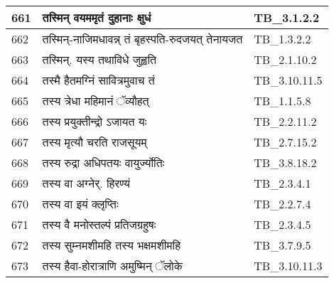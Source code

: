 \documentclass[17pt]{extarticle}
\begin{document}
\begin{longtable}{||p{0.4in}||p{4.9in}||p{0.9in}||}
    \hline
        
    661 & तस्मिन् वयममृतं दुहानाः क्षुधं & TB\_3.1.2.2       \\
    
    \hline
        
    662 & तस्मिन्{-}नाजिमधावन्न् तं बृहस्पति{-}रुदजयत् तेनायजत & TB\_1.3.2.2       \\
    
    \hline
        
    663 & तस्मिन्. यस्य तथाविधे जुह्वति & TB\_2.1.10.2       \\
    
    \hline
        
    664 & तस्मै हैतमग्निं सावित्रमुवाच तं & TB\_3.10.11.5       \\
    
    \hline
        
    665 & तस्य त्रेधा महिमानं ॅव्यौहत् & TB\_1.1.5.8       \\
    
    \hline
        
    666 & तस्य प्रयुक्तीन्द्रो ऽजायत यः & TB\_2.2.11.2       \\
    
    \hline
        
    667 & तस्य मृत्यौ चरति राजसूयम् & TB\_2.7.15.2       \\
    
    \hline
        
    668 & तस्य रुद्रा अधिपतयः वायुर्ज्योतिः & TB\_3.8.18.2       \\
    
    \hline
        
    669 & तस्य वा अग्नेर्. हिरण्यं & TB\_2.3.4.1       \\
    
    \hline
        
    670 & तस्य वा इयं क्लृप्तिः & TB\_2.2.7.4       \\
    
    \hline
        
    671 & तस्य वै मनोस्तल्पं प्रतिजग्रहुषः & TB\_2.3.4.5       \\
    
    \hline
        
    672 & तस्य सुम्नमशीमहि तस्य भक्षमशीमहि & TB\_3.7.9.5       \\
    
    \hline
        
    673 & तस्य हैवा{-}होरात्राणि अमुष्मिन् ॅलोके & TB\_3.10.11.3       \\
    

\end{longtable}
\end{document}
